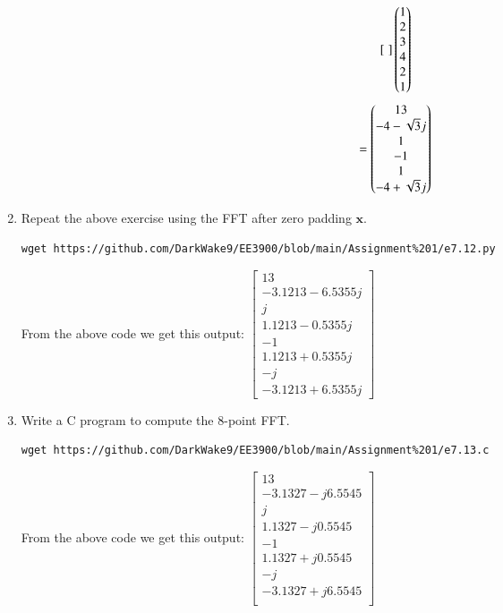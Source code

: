 \documentclass[journal,12pt,twocolumn]{IEEEtran}
\let\vec\mathbf
\renewcommand\thesection{\arabic{section}}
\begin{document}
\begin{enumerate}[label=\arabic*.,ref=\thesection.\theenumi]
\begin{align}
\begin{bsmallmatrix}
	\end{bsmallmatrix}
	\begin{pmatrix}1\\2\\3\\4\\2\\1\end{pmatrix}
\end{align}
\begin{align}
	=\begin{pmatrix}13\\-4 - \sqrt{3}j\\ 1\\-1\\1\\-4 + \sqrt{3}j\end{pmatrix}
\end{align}





\item Repeat the above exercise using the FFT
after zero padding $\vec{x}$.\\

\solution
\begin{lstlisting}
wget https://github.com/DarkWake9/EE3900/blob/main/Assignment%201/e7.12.py
\end{lstlisting}


From the above code we get this output:
$\begin{bmatrix}
	13\\
	-3.1213-6.5355j\\
	j\\
	1.1213-0.5355j\\
	-1\\
	1.1213+0.5355j\\
	-j\\
	-3.1213+6.5355j
\end{bmatrix}$

\item Write a C program to compute the 8-point FFT. \\

\solution
\begin{lstlisting}
wget https://github.com/DarkWake9/EE3900/blob/main/Assignment%201/e7.13.c
\end{lstlisting}

 From the above code we get this output:
$\begin{bmatrix}
	13\\
	-3.1327 - j6.5545\\
	j\\
	1.1327 - j0.5545\\
	-1\\
	1.1327 + j0.5545\\
	- j\\
	-3.1327 + j6.5545\\
\end{bmatrix}$
\vspace{1cm}



\end{enumerate}
\end{document}
